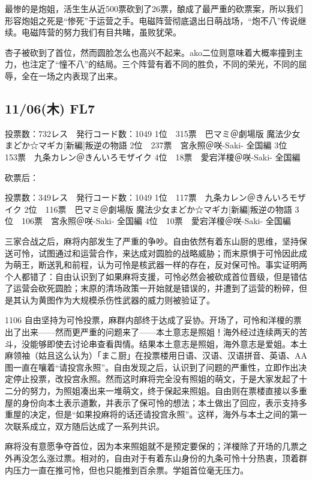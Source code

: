 最惨的是炮姐，活生生从近500票砍到了26票，酿成了最严重的砍票案，所以我们形容炮姐之死是“惨死”于运营之手。电磁阵营彻底退出日萌战场，“炮不八”传说继续。电磁阵营的努力我们有目共睹，虽败犹荣。

杏子被砍到了首位，然而圆脸怎么也高兴不起来。ako二位则意味着大概率撞到主力，也注定了“憧不八”的结局。三个阵营有着不同的胜负，不同的荣光，不同的屈辱，全在一场之内表现了出来。

\subsection{11/06(木) FL7}

	投票数：732レス　発行コード数：1049
	1位　315票　巴マミ＠劇場版 魔法少女まどか☆マギカ[新編]叛逆の物語
	2位　237票　宮永照＠咲-Saki- 全国編
	3位　153票　九条カレン＠きんいろモザイク
	4位　18票　愛宕洋榎＠咲-Saki- 全国編

砍票后：

	投票数：349レス　発行コード数：1049
	1位　117票　九条カレン＠きんいろモザイク
	2位　116票　巴マミ＠劇場版 魔法少女まどか☆マギカ[新編]叛逆の物語
	3位　106票　宮永照＠咲-Saki- 全国編
	4位　10票　愛宕洋榎＠咲-Saki- 全国編

三家合战之后，麻将内部发生了严重的争吵。自由依然有着东山厨的思维，坚持保送可怜，试图通过和运营合作，来达成对圆脸的战略威胁；而末原惧于可怜因此成为萌王，断送乳和前程，认为可怜是核武器一样的存在，反对保可怜。事实证明两个人都错了：自由认识到了如果麻将支援，可怜必然会被砍成首位晋级，但是错估了运营会砍死圆脸；末原的清场政策一开始就是错误的，并遭到了运营的粉碎，但是其认为黄图作为大规模杀伤性武器的威力则被验证了。

1106 自由坚持为可怜投票，麻群内部终于达成了妥协。开场了，可怜和洋榎的票出了出来——然而更严重的问题来了——本土意志是照姐！海外经过连续两天的苦斗，没能够即使去讨论串查看舆情。结果本土意志是照姐，海外意志是爱姐。本土麻领袖（姑且这么认为）「まこ厨」在投票楼用日语、汉语、汉语拼音、英语、AA图一直在嚷着“请投宫永照”。自由发现之后，认识到了问题的严重性，立即作出决定停止投票，改投宫永照。然而这时麻将完全没有照姐的萌文，于是大家发起了十二分的努力，为照姐凑出来一堆萌文，终于保起来照姐。自由则在票楼直接以多重屋的身份向本土表示道歉，并表示了保可怜的想法；本土做出了回应，表示支持多重屋的决定，但是“如果投麻将的话还请投宫永照”。这样，海外与本土之间的第一次联系成立，双方随后达成了一系列共识。

麻将没有意愿争夺首位，因为本来照姐就不是预定要保的；洋榎除了开场的几票之外再没怎么涨过票。相对的，自由对于有着东山身份的九条可怜十分热衷，顶着群内压力一直在推可怜，但也只能推到百余票。学姐首位毫无压力。


